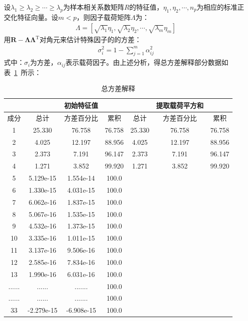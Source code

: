 \documentclass{whutmod}
\begin{document}
	设$\lambda_{1} \geqslant \lambda_{2} \geqslant \cdots \geqslant \lambda_{p}$为样本相关系数矩阵$R$的特征值，$\eta _ { 1 } , \eta _ { 2 } , \cdots , n _ { p }$为相应的标准正交化特征向量。设$m<p$，则因子载荷矩阵$\Lambda$为：
	\begin{gather}
	\Lambda=\left[\sqrt{\lambda_{1}} \eta_{1}, \sqrt{\lambda_{2}} \eta_{2}, \cdots, \sqrt{\lambda_{m}} \eta_{m}\right]
	\end{gather}
    用$\boldsymbol{R}-\boldsymbol{\Lambda} \boldsymbol{\Lambda}^{\mathrm{T}}$对角元来估计特殊因子的的方差：
	\begin{gather}
	\sigma_{i}^{2}=1-\sum_{j=1}^{m} \alpha_{i j}^{2}
	\end{gather}
	式中：$\sigma_{i}$为方差，$\alpha_{ij}$表示载荷因子。由上述分析，得总方差解释部分数据如表~\ref{biaosan}~所示：	
		\begin{table}[H]
		\centering
		\caption{总方差解释}\label{biaosan}
		\begin{tabular}{ccccccc}
			\toprule[1.5pt]
		\multicolumn{1}{m{1cm}}{\centering } &
				\multicolumn{1}{m{1.5cm}}{\centering  } &
		 \multicolumn{1}{m{3cm}}{\centering 初始特征值} &
		 		\multicolumn{1}{m{1cm}|}{\centering  } &
		\multicolumn{1}{m{1cm}}{\centering  } &
		 \multicolumn{1}{m{3cm}}{\centering 提取载荷平方和}&
		 		\multicolumn{1}{m{1.5cm}}{\centering  } \\\hline
		\multicolumn{1}{m{1cm}|}{\centering  成分} &
		\multicolumn{1}{m{1.5cm}}{\centering  总计} &
		\multicolumn{1}{m{3cm}}{\centering  方差百分比} &
		\multicolumn{1}{m{1cm}|}{\centering  累积} &
		\multicolumn{1}{m{1cm}}{\centering  总计} &
		\multicolumn{1}{m{3cm}}{\centering  方差百分比} &				\multicolumn{1}{m{1.5cm}}{\centering  累积} \\

			\midrule[1pt]
			1&25.330&76.758&76.758&25.330&76.758&76.758 \\
			2&4.025&12.197&88.956&4.025&12.197&88.956 \\
			3&2.373&7.191&96.147&2.373&7.191&96.147 \\
			4&1.271&3.852&99.920&1.271&3.852&99.920 \\
			5&5.129e-15&1.554e-14&100.0&&& \\
			6&1.330e-15&4.031e-15&100.0&&& \\
			7&6.062e-16&1.837e-15&100.0&&& \\
			8&5.067e-16&1.535e-15&100.0&&& \\
			9&4.532e-16&1.373e-15&100.0&&& \\
			10&3.335e-16&1.011e-15&100.0&&& \\
			11&3.137e-16&9.506e-16&100.0&&& \\
			12&2.585e-16&7.834e-16&100.0&&& \\
			13&1.990e-16&6.031e-16&100.0&&& \\
			......&......&.......&100.0&&& \\
			......&......&.......&100.0&&& \\
			33&-2.279e-15&-6.908e-15&100.0&&& \\
			\bottomrule[1.5pt]
		\end{tabular}
	\end{table}
	
\end{document}
